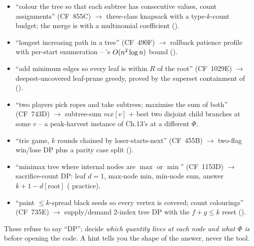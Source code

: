 \begin{itemize}[nosep, leftmargin=1.4em]
  \item ``colour the tree so that each subtree has consecutive values, count
        assignments'' (CF~855C) $\longrightarrow$ three-class knapsack with a
        type-$k$-count budget; the merge is  with a
        multinomial coefficient ().
  \item ``longest increasing path in a tree'' (CF~490F) $\longrightarrow$
        rollback patience profile with per-start enumeration --
        's $O(n^2 \log n)$ bound
        ().
  \item ``add minimum edges so every leaf is within $R$ of the root''
        (CF~1029E) $\longrightarrow$ deepest-uncovered leaf-prune greedy,
        proved by the superset containment of 
        ().
  \item ``two players pick ropes and take subtrees; maximise the sum of both''
        (CF~743D) $\longrightarrow$ subtree-sum $\mathit{mx}[v]$ + best two
        disjoint child branches at some $v$ -- a peak-harvest instance of
        Ch.13's  at a different $\Phi$.
  \item ``trie game, $k$ rounds chained by loser-starts-next'' (CF~455B)
        $\longrightarrow$ two-flag win/lose DP plus a parity case split
        ().
  \item ``minimax tree where internal nodes are $\max$ or $\min$'' (CF~1153D)
        $\longrightarrow$ sacrifice-count DP: leaf $d=1$, max-node min, min-node
        sum, answer $k + 1 - d[\text{root}]$ ( practice).
  \item ``paint $\le k$-spread black seeds so every vertex is covered; count
        colourings'' (CF~735E) $\longrightarrow$ supply/demand 2-index
        tree DP with the $f+g \le k$ reset ().
\end{itemize}


These refuse to say ``DP''; decide \emph{which quantity lives at each node
and what $\Phi$ is} before opening the code. A hint tells you the shape of
the answer, never the tool.

